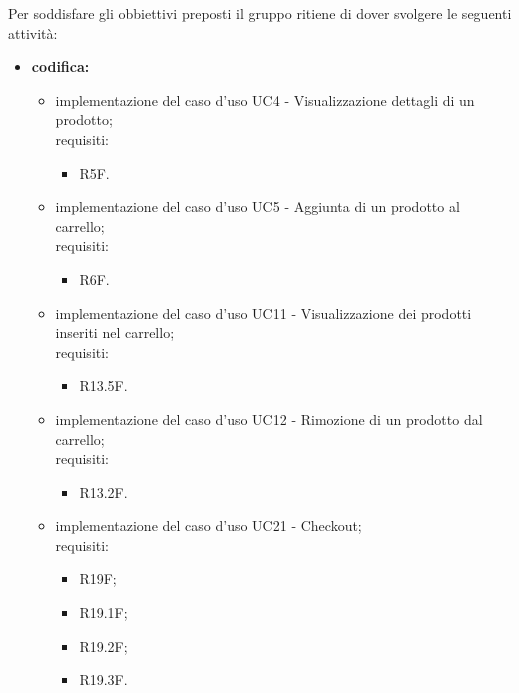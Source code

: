 Per soddisfare gli obbiettivi preposti il gruppo ritiene di dover svolgere le seguenti attività:
\begin{itemize}
    \item \textbf{codifica:}
          \begin{itemize}
              \item implementazione del caso d'uso UC4 - Visualizzazione dettagli di un prodotto;\\
                    requisiti:
                    \begin{itemize}
                        \item R5F.
                    \end{itemize}
              \item implementazione del caso d'uso UC5 - Aggiunta di un prodotto al carrello;\\
                    requisiti:
                    \begin{itemize}
                        \item R6F.
                    \end{itemize}
              \item implementazione del caso d'uso UC11 - Visualizzazione dei prodotti inseriti nel carrello;\\
                    requisiti:
                    \begin{itemize}
                        \item R13.5F.
                    \end{itemize}
              \item implementazione del caso d'uso UC12 - Rimozione di un prodotto dal carrello;\\
                    requisiti:
                    \begin{itemize}
                        \item R13.2F.
                    \end{itemize}
              \item implementazione del caso d'uso UC21 - Checkout;\\
                    requisiti:
                    \begin{itemize}
                        \item R19F;
                        \item R19.1F;
                        \item R19.2F;
                        \item R19.3F.

\end{itemize}
\end{itemize}
\end{itemize}

